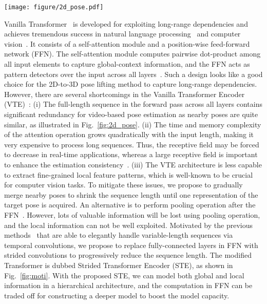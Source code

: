 \documentclass[journal]{IEEEtran}
\begin{document}
\begin{figure*}[t]
   \centering
   \texttt{[image: figure/2d\_pose.pdf]}
   \caption
   {
      Example of 2D pose sequences of 27 consecutive frames (520 ms) on Human3.6M dataset (captured from 50 Hz cameras). 
      It contains huge redundant information as nearby poses are same. 
      The rectangle denotes the center frame. 
   }
   \label{fig:2d_pose}
\end{figure*}

Vanilla Transformer~\cite{Attention} is developed for exploiting long-range dependencies and achieves tremendous success in natural language processing~\cite{tay2020efficient,zihang2020funnel-transformer} and computer vision~\cite{han2020survey,he2021transreid,li2021trear,han2020exploiting,li2021transformer}. 
It consists of a self-attention module and a position-wise feed-forward network (FFN). 
The self-attention module computes pairwise dot-product among all input elements to capture global-context information, and the FFN acts as pattern detectors over the input across all layers~\cite{geva2020transformer}. 
Such a design looks like a good choice for the 2D-to-3D pose lifting method to capture long-range dependencies. 
However, there are several shortcomings in the Vanilla Transformer Encoder (VTE)~\cite{Attention}:
(i) The full-length sequence in the forward pass across all layers contains significant redundancy for video-based pose estimation as nearby poses are quite similar, as illustrated in Fig.~\ref{fig:2d_pose}. 
(ii) The time and memory complexity of the attention operation grows quadratically with the input length, making it very expensive to process long sequences. 
Thus, the receptive field may be forced to decrease in real-time applications, whereas a large receptive field is important to enhance the estimation consistency~\cite{liu2020attention}. 
(iii) The VTE architecture is less capable to extract fine-grained local feature patterns, which is well-known to be crucial for computer vision tasks. 
To mitigate these issues, we propose to gradually merge nearby poses to shrink the sequence length until one representation of the target pose is acquired. 
An alternative is to perform pooling operation after the FFN~\cite{zihang2020funnel-transformer}. 
However, lots of valuable information will be lost using pooling operation, and the local information can not be well exploited. 
Motivated by the previous methods~\cite{pavllo20193d,liu2020attention} that are able to elegantly handle variable-length sequences via temporal convolutions, we propose to replace fully-connected layers in FFN with strided convolutions to progressively reduce the sequence length. 
The modified Transformer is dubbed Strided Transformer Encoder (STE), as shown in Fig.~\ref{fig:moti}. 
With the proposed STE, we can model both global and local information in a hierarchical architecture, and the computation in FFN can be traded off for constructing a deeper model to boost the model capacity. 
\end{document}
